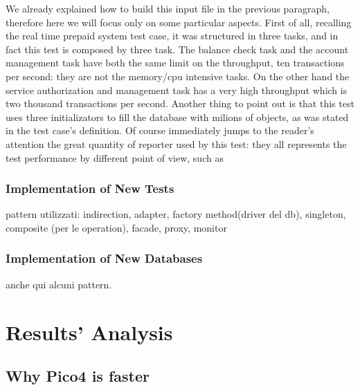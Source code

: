 We already explained how to build this input file in the previous paragraph, therefore here we will focus only on some particular aspects. First of all, recalling the real time prepaid system test case, it was structured in three tasks, and in fact this test is composed by three task. The balance check task and the account management task have both the same limit on the throughput, ten transactions per second: they are not the memory/cpu intensive tasks. On the other hand the service authorization and management task has a very high throughput which is two thousand transactions per second. Another thing to point out is that this test uses three initializators to fill the database with milions of objects, as was stated in the test case's definition. Of course immediately jumps to the reader's attention the great quantity of reporter used by this test: they all represents the test performance by different point of view, such as







			
		\subsection{Implementation of New Tests}%
			pattern utilizzati: indirection, adapter, factory method(driver del db), singleton, 
		composite (per le operation), facade, proxy, monitor
		
		
		\subsection{Implementation of New Databases}%
anche qui alcuni pattern.


\chapter{Results' Analysis}
	\section{Why Pico4 is faster}
